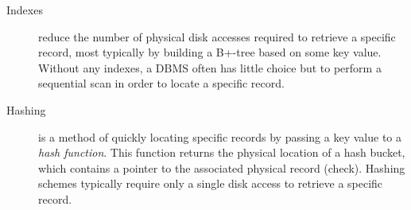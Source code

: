 \documentclass{llncs}
\begin{document}
\begin{description}

	\item[Indexes] reduce the number of physical disk accesses required
	to retrieve a specific record, most typically by building a B+-tree
	\cite{Knut-DE-1997-Art} based on some key value. Without any
	indexes, a DBMS often has little choice but to perform a sequential
	scan in order to locate a specific record.

% 
% 

	\item[Hashing] is a method of quickly locating specific records by
	passing a key value to a \emph{hash function}. This function returns
	the physical location of a hash bucket, which contains a pointer to
	the associated physical record (check). Hashing schemes typically
	require only a single disk access to retrieve a specific record.


\end{description}
\end{document}
